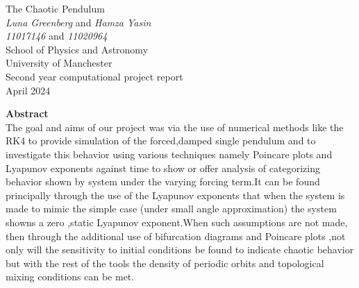 \documentclass[11pt]{article} %
\begin{document}

\begin{titlepage} %
\begin{center} %

{\Huge The Chaotic Pendulum}\\[0.5cm] %
\textit{Luna Greenberg} and \textit{Hamza Yasin}~\\[0.3cm] %
\textit{11017146} and \textit{11020964}~\\[0.3cm]
School of Physics and Astronomy~\\[0.3cm]
University of Manchester~\\[0.3cm]
Second year computational project report~\\[0.3cm]
April 2024~\\[2cm]


\end{center}
{\Large \textbf{Abstract}}~\\[0.3cm]
The goal and aims of our project was via the use of numerical methods like the RK4 to provide simulation of the forced,damped single pendulum and to investigate this behavior using various techniques namely Poincare plots and Lyapunov exponents against time to show or offer analysis of categorizing behavior shown by system under the varying forcing term.It can be found principally through the use of the Lyapunov exponents that when the system is made to mimic the simple case (under small angle approximation) the system showns a zero ,static Lyapunov exponent.When such assumptions are not made, then through the additional use of bifurcation diagrams and Poincare plots ,not only will the sensitivity to initial conditions be found to indicate chaotic behavior but with the rest of the tools the density of periodic orbits and topological mixing conditions can be met.

\end{titlepage}
\clearpage
{} %
\setcounter{page}{2} %

\newpage %
\end{document}
